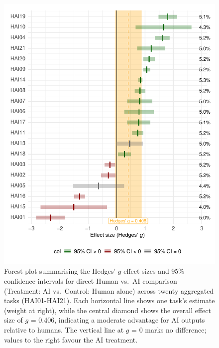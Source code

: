 \documentclass[manuscript, screen, review, acmsmall, anonymous]{acmart}
\begin{document}
\begin{figure}[H]
  \centering
  \includegraphics[width=\linewidth]{plot_versus_agg_forest}
  \caption{Forest plot summarising the Hedges’ $g$ effect sizes and 95\% confidence intervals for direct Human vs.\ AI comparison (Treatment: AI vs.\ Control: Human alone) across twenty aggregated tasks (HAI01-HAI21). Each horizontal line shows one task’s estimate (weight at right), while the central diamond shows the overall effect size of $g$ = 0.406, indicating a moderate advantage for AI outputs relative to humans. The vertical line at $g$ = 0 marks no difference; values to the right favour the AI treatment.}
  \label{fig:versus_agg_forest}
\end{figure}
\end{document}
